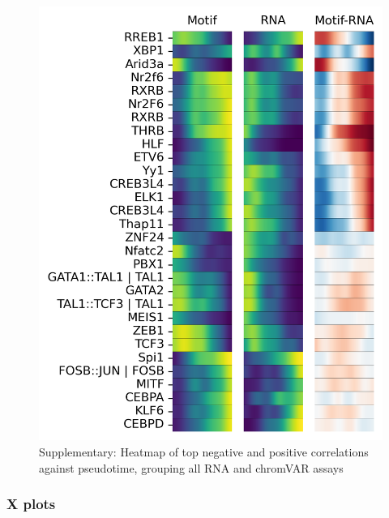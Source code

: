 \documentclass[a4paper]{article}
\begin{document}
\begin{figure}[!htb]
  \centering
  \includegraphics[width=\textwidth]{../figures/hematopoiesis/Monocyte_40_15_single_smooth_none_heatmap_grouped_assays.png}
  \caption{Supplementary: Heatmap of top negative and positive correlations against pseudotime, grouping all RNA and chromVAR assays}
\end{figure}

\FloatBarrier
\subsubsection{X plots}
 
\end{document}
